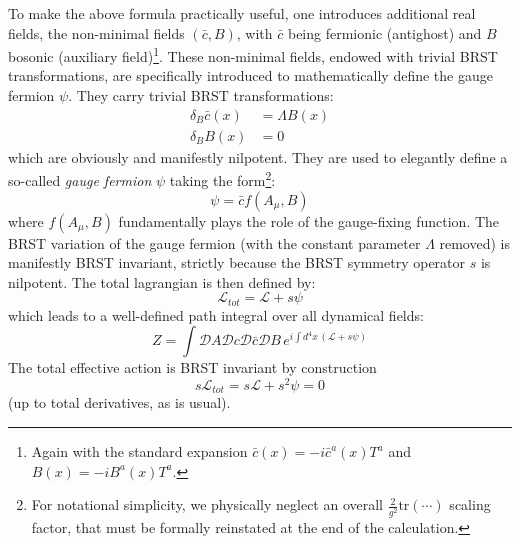 To make the above formula practically useful, one introduces additional real fields, the non-minimal fields \((\bar{c}, B)\), with \(\bar{c}\) being fermionic (antighost) and \(B\) bosonic (auxiliary field)\footnote{Again with the standard expansion \(\bar{c}(x) = -i\bar{c}^a(x)T^a\) and \(B(x) = -iB^a(x)T^a\).}. These non-minimal fields, endowed with trivial BRST transformations, are specifically introduced to mathematically define the gauge fermion \(\psi\). They carry trivial BRST transformations:
\begin{equation} \label{eq:52}
    \begin{aligned}
        \delta_B \bar{c}(x) & = \Lambda B(x) \\
        \delta_B B(x)       & = 0
    \end{aligned}
\end{equation}
which are obviously and manifestly nilpotent. They are used to elegantly define a so-called \textit{gauge fermion} \(\psi\) taking the form\footnote{For notational simplicity, we physically neglect an overall \(\frac{2}{g^2}\text{tr}(\cdots)\) scaling factor, that must be formally reinstated at the end of the calculation.}:
\begin{equation} \label{eq:53}
    \psi = \bar{c} f(A_\mu, B)
\end{equation}
where \(f(A_\mu, B)\) fundamentally plays the role of the gauge-fixing function. The BRST variation of the gauge fermion (with the constant parameter \(\Lambda\) removed) is manifestly BRST invariant, strictly because the BRST symmetry operator \(s\) is nilpotent. The total lagrangian is then defined by:
\begin{equation} \label{eq:54}
    \mathcal{L}_{tot} = \mathcal{L} + s\psi
\end{equation}
which leads to a well-defined path integral over all dynamical fields:
\begin{equation} \label{eq:path_integral_full}
    Z = \int \mathcal{D}A \mathcal{D}c \mathcal{D}\bar{c} \mathcal{D}B \, e^{i \int d^4x \, (\mathcal{L} + s\psi)}
\end{equation}
The total effective action is BRST invariant by construction
\begin{equation} \label{eq:55}
    s\mathcal{L}_{tot} = s\mathcal{L} + s^2\psi = 0
\end{equation}
(up to total derivatives, as is usual).

